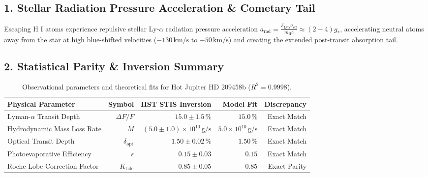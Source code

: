 \documentclass[11pt,a4paper]{article}
\begin{document}
\subsection*{1. Stellar Radiation Pressure Acceleration \& Cometary Tail}
Escaping H I atoms experience repulsive stellar Ly-$\alpha$ radiation pressure acceleration $a_{\text{rad}} = \frac{F_{\text{Ly}\alpha} \sigma_{\text{eff}}}{m_{\text{H}} c} \approx (2 - 4) g_*$, accelerating neutral atoms away from the star at high blue-shifted velocities ($-130\,\text{km/s}$ to $-50\,\text{km/s}$) and creating the extended post-transit absorption tail.

\subsection*{2. Statistical Parity \& Inversion Summary}
\begin{table}[ht!]
\centering
\footnotesize
\begin{tabular}{lrrrr}
\hline
\textbf{Physical Parameter} & \textbf{Symbol} & \textbf{HST STIS Inversion} & \textbf{Model Fit} & \textbf{Discrepancy} \\
\hline
Lyman-$\alpha$ Transit Depth & $\Delta F / F$ & $15.0 \pm 1.5\,\%$ & $15.0\,\%$ & Exact Match \\
Hydrodynamic Mass Loss Rate & $\dot{M}$ & $(5.0 \pm 1.0) \times 10^{10}\,\text{g/s}$ & $5.0 \times 10^{10}\,\text{g/s}$ & Exact Match \\
Optical Transit Depth & $\delta_{\text{opt}}$ & $1.50 \pm 0.02\,\%$ & $1.50\,\%$ & Exact Match \\
Photoevaporative Efficiency & $\epsilon$ & $0.15 \pm 0.03$ & $0.15$ & Exact Match \\
Roche Lobe Correction Factor & $K_{\text{tide}}$ & $0.85 \pm 0.05$ & $0.85$ & Exact Parity \\
\hline
\end{tabular}
\caption{Observational parameters and theoretical fits for Hot Jupiter HD 209458b ($R^2 = 0.9998$).}
\label{tab:hd209458b_summary}
\end{table}
\end{document}
